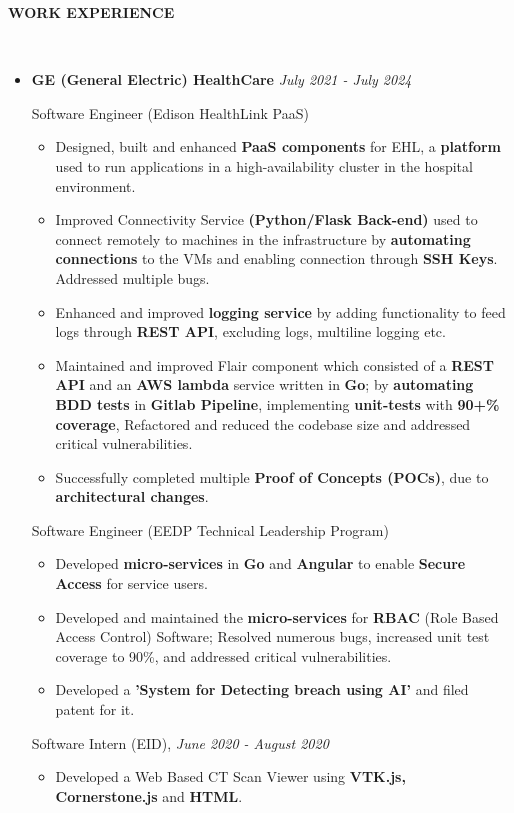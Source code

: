 \documentclass[a4paper,10pt]{article}
\newcommand{\isep}{-2 pt}
\newcommand{\lsep}{-0.6cm}
\newcommand{\resheading}[1]{{\small \colorbox{mygrey}{\begin{minipage}{0.975\textwidth}{\textbf{#1 \vphantom{p\^{E}}}}\end{minipage}}}}
\begin{document}
\resheading{\textbf{WORK EXPERIENCE} }\\[\lsep]
\vspace{1.0pt}
\begin{itemize}
\item \textbf{GE (General Electric) HealthCare} \hfill \emph{July 2021 - July 2024}
\setlength{\itemsep}{1pt}
\setlength{\parskip}{0pt}
\setlength{\parsep}{0pt}

Software Engineer (Edison HealthLink PaaS)
\vspace{-2pt}
	\begin{itemize}\itemsep \isep
	\item Designed, built and enhanced \textbf{PaaS components} for EHL, a \textbf{platform} used to run applications in a high-availability cluster in the hospital environment. 
    \item Improved Connectivity Service \textbf{(Python/Flask Back-end)} used to connect remotely to machines in the infrastructure by \textbf{automating connections} to the VMs and enabling connection through \textbf{SSH Keys}. Addressed multiple bugs.
    \item Enhanced and improved \textbf{logging service} by adding functionality to feed logs through \textbf{REST API}, excluding logs, multiline logging etc.
    \item Maintained and improved Flair component which consisted of a \textbf{REST API} and an \textbf{AWS lambda} service written in \textbf{Go}; by \textbf{automating BDD tests} in \textbf{Gitlab Pipeline}, implementing \textbf{unit-tests} with \textbf{90+\% coverage}, Refactored and reduced the codebase size and addressed critical vulnerabilities. 
    \item Successfully completed multiple \textbf{Proof of Concepts (POCs)}, due to \textbf{architectural changes}.
	\end{itemize}
\vspace{-2pt}

Software Engineer (EEDP Technical Leadership Program)
\vspace{-2pt}
	\begin{itemize}\itemsep \isep
	\item Developed \textbf{micro-services} in \textbf{Go} and \textbf{Angular} to enable \textbf{Secure Access} for service users.
    \item Developed and maintained the \textbf{micro-services} for \textbf{RBAC} (Role Based Access Control) Software; Resolved numerous bugs, increased unit test coverage to 90\%, and addressed critical vulnerabilities.
	\item  Developed a \textbf{'System for Detecting breach using AI'} and filed patent for it.
	\end{itemize}
\vspace{-2pt}

Software Intern (EID), \hfill \emph{June 2020 - August 2020}
\vspace{-2pt}
	\begin{itemize}\itemsep \isep
	\item  Developed a Web Based CT Scan Viewer using \textbf{VTK.js, Cornerstone.js} and \textbf{HTML}.
	\end{itemize}
\end{itemize}
\end{document}
